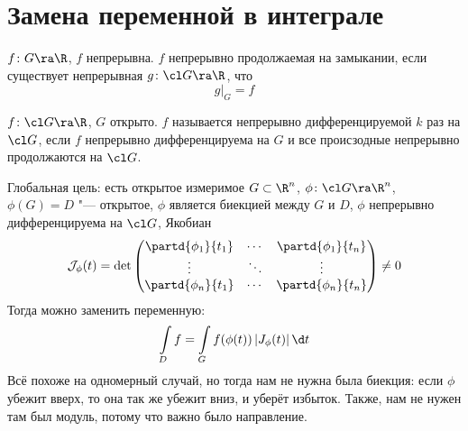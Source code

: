 \section{Замена переменной в интеграле}

\begin{Def}
	$f\colon G \ra \R$, $f$ непрерывна.
	$f$ непрерывно продолжаемая на замыкании, если существует непрерывная $g\colon \cl G \ra \R$, что
	\[ g \biggr|_G = f \]
\end{Def}

\begin{Def}
	$f\colon \cl G \ra \R$, $G$ открыто.
	$f$ называется непрерывно дифференцируемой $k$ раз на $\cl G$,
	если $f$ непрерывно дифференцируема на $G$ и все происзодные непрерывно продолжаются на $\cl G$.
\end{Def}

Глобальная цель: есть открытое измеримое $G \subset \R^n$, $\phi\colon \cl G \ra \R^n$,
$\phi(G) = D$ "--- открытое, $\phi$ является биекцией между $G$ и $D$, $\phi$ непрерывно дифференцируема на $\cl G$,
Якобиан
\[	\mathcal J_\phi(t) = \det \begin{pmatrix}
		\partd{\phi_1}{t_1} & \cdots & \partd{\phi_1}{t_n} \\
		\vdots & \ddots & \vdots \\
		\partd{\phi_n}{t_1} & \cdots & \partd{\phi_n}{t_n}
	\end{pmatrix} \ne 0
\]
Тогда можно заменить переменную:
\[
	\int\limits_D f = \int\limits_G f(\phi(t)) \left| J_\phi(t) \right| \d t
\]
Всё похоже на одномерный случай, но тогда нам не нужна была биекция: если $\phi$ убежит вверх, то она так же убежит вниз, и уберёт избыток.
Также, нам не нужен там был модуль, потому что важно было направление.
